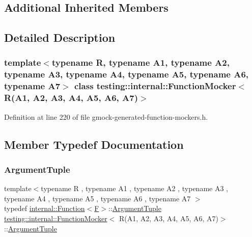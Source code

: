 \subsection*{Additional Inherited Members}


\subsection{Detailed Description}
\subsubsection*{template$<$typename R, typename A1, typename A2, typename A3, typename A4, typename A5, typename A6, typename A7$>$\newline
class testing\+::internal\+::\+Function\+Mocker$<$ R(\+A1, A2, A3, A4, A5, A6, A7)$>$}



Definition at line 220 of file gmock-\/generated-\/function-\/mockers.\+h.



\subsection{Member Typedef Documentation}
\mbox{\label{classtesting_1_1internal_1_1FunctionMocker_3_01R_07A1_00_01A2_00_01A3_00_01A4_00_01A5_00_01A6_00_01A7_08_4_a313911b9c80b57c8c25f0ad5ef2d0bdc}} 
\subsubsection{\texorpdfstring{Argument\+Tuple}{ArgumentTuple}}
{\footnotesize\ttfamily template$<$typename R , typename A1 , typename A2 , typename A3 , typename A4 , typename A5 , typename A6 , typename A7 $>$ \\
typedef \hyperlink{structtesting_1_1internal_1_1Function}{internal\+::\+Function}$<$\hyperlink{classtesting_1_1internal_1_1FunctionMocker_3_01R_07A1_00_01A2_00_01A3_00_01A4_00_01A5_00_01A6_00_01A7_08_4_a2ea0e33d9cc0d1f57d58b4aee98c117c}{F}$>$\+::\hyperlink{classtesting_1_1internal_1_1FunctionMocker_3_01R_07A1_00_01A2_00_01A3_00_01A4_00_01A5_00_01A6_00_01A7_08_4_a313911b9c80b57c8c25f0ad5ef2d0bdc}{Argument\+Tuple} \hyperlink{classtesting_1_1internal_1_1FunctionMocker}{testing\+::internal\+::\+Function\+Mocker}$<$ R(A1, A2, A3, A4, A5, A6, A7)$>$\+::\hyperlink{classtesting_1_1internal_1_1FunctionMocker_3_01R_07A1_00_01A2_00_01A3_00_01A4_00_01A5_00_01A6_00_01A7_08_4_a313911b9c80b57c8c25f0ad5ef2d0bdc}{Argument\+Tuple}}



